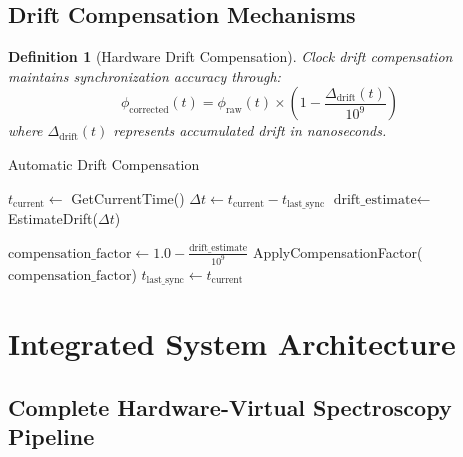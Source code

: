 \documentclass[12pt,a4paper]{article}
\newtheorem{definition}[theorem]{Definition}
\begin{document}
\subsection{Drift Compensation Mechanisms}

\begin{definition}[Hardware Drift Compensation]
Clock drift compensation maintains synchronization accuracy through:
\begin{equation}
\phi_{\text{corrected}}(t) = \phi_{\text{raw}}(t) \times \left(1 - \frac{\Delta_{\text{drift}}(t)}{10^9}\right)
\end{equation}
where $\Delta_{\text{drift}}(t)$ represents accumulated drift in nanoseconds.
\end{definition}

\begin{algorithm}[H]
\caption{Automatic Drift Compensation}
\begin{algorithmic}[1]
    \State $t_{\text{current}} \gets$ GetCurrentTime()
    \State $\Delta t \gets t_{\text{current}} - t_{\text{last\_sync}}$
    \State $\text{drift\_estimate} \gets$ EstimateDrift($\Delta t$)

        \State $\text{compensation\_factor} \gets 1.0 - \frac{\text{drift\_estimate}}{10^9}$
        \State ApplyCompensationFactor($\text{compensation\_factor}$)
        \State $t_{\text{last\_sync}} \gets t_{\text{current}}$
    \EndIf
\EndProcedure
\end{algorithmic}
\end{algorithm}

\section{Integrated System Architecture}

\subsection{Complete Hardware-Virtual Spectroscopy Pipeline}
\end{document}
